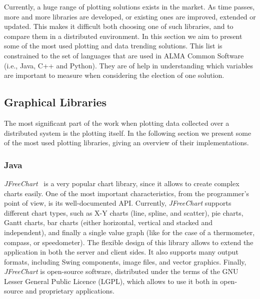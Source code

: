 Currently, a huge range of plotting solutions exists in the market. As time
passes, more and more libraries are developed, or existing ones are improved,
extended or updated. This makes it difficult both choosing one of such libraries,
and to compare them in a distributed environment.
In this section we aim to present some of the most used plotting and data
trending solutions. This list is constrained to the set of languages that are
used in ALMA Common Software (i.e., Java, C++ and
Python).
They are of help in understanding which
variables are important to measure when considering the election of one
solution.

\subsection{Graphical Libraries}

The most significant part of the work when plotting data collected over a
distributed system is the plotting itself. In the following section we present
some of the most used plotting libraries, giving an overview of their
implementations.

\subsubsection{Java}

\emph{JFreeChart}~\cite{JFreeChart} is a very popular chart library, since it allows to create complex charts easily.
One of the most important characteristics, from the programmer's point of view, is its well-documented API.
Currently, \emph{JFreeChart} supports different chart types, such as X-Y charts (line, spline, and scatter),
pie charts, Gantt charts, bar charts (either horizontal, vertical and stacked and independent), and finally
a single value graph (like for the case of a thermometer, compass, or speedometer).
The flexible design of this library allows to extend the application in both the server and client sides.
It also supports many output formats, including Swing components, image files, and
vector graphics.
Finally, \emph{JFreeChart} is open-source software, distributed under the terms of the GNU Lesser General
Public Licence (LGPL), which allows to use it both in open-source and proprietary applications.

